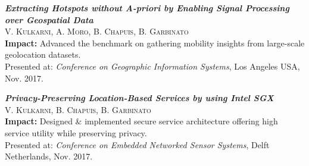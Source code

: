 \begin{itemize}[leftmargin=*]
{    \item \textbf{\textit{Extracting Hotspots without A-priori by Enabling Signal Processing over Geospatial Data}}\\
    \textsc{V. Kulkarni, A. Moro, B. Chapuis, B. Garbinato}\\
    \textbf{Impact:} Advanced the benchmark on gathering mobility insights from large-scale geolocation datasets.\\
    Presented at: \textit{Conference on Geographic Information Systems}, Los Angeles USA, Nov. 2017.

    \item \textbf{\textit{Privacy-Preserving Location-Based Services by using Intel SGX}}\\
    \textsc{V. Kulkarni, B. Chapuis, B. Garbinato}\\
    \textbf{Impact:} Designed \& implemented secure service architecture offering high service utility while preserving privacy.\\
    Presented at: \textit{Conference on Embedded Networked Sensor Systems}, Delft Netherlands, Nov. 2017.

    }
    
\end{itemize}
